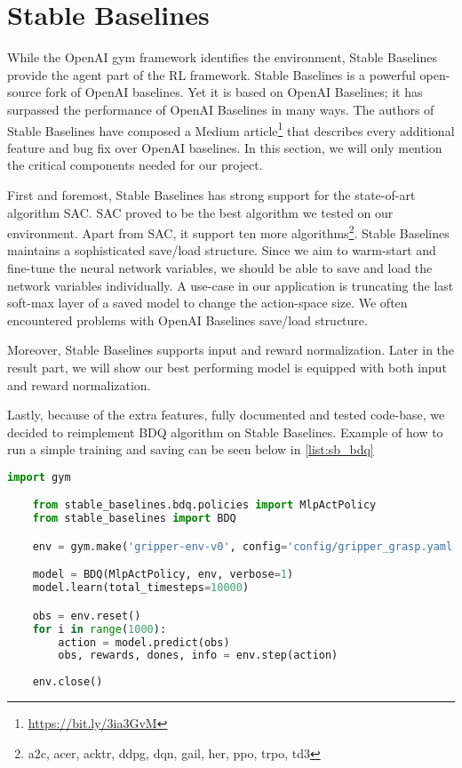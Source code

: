 \section{Stable Baselines}


While the OpenAI gym framework identifies the environment, Stable Baselines provide the agent part of the RL framework. Stable Baselines is a powerful open-source fork of OpenAI baselines. Yet it is based on OpenAI Baselines; it has surpassed the performance of OpenAI Baselines in many ways. 
The authors of Stable Baselines have composed a Medium article\footnote{\url{https://bit.ly/3ia3GvM}} that describes every additional feature and bug fix over OpenAI baselines. In this section, we will only mention the critical components needed for our project.

First and foremost, Stable Baselines has strong support for the state-of-art algorithm SAC. SAC proved to be the best algorithm we tested on our environment. Apart from SAC, it support ten more algorithms\footnote{a2c, 
acer, acktr, ddpg, dqn, gail, her, ppo, trpo, td3}. Stable Baselines maintains a sophisticated save/load structure. Since we aim to warm-start and fine-tune the neural network variables, we should be able to save and load the network variables individually. A use-case in our application is truncating the last soft-max layer of a saved model to change the action-space size. We often encountered problems with OpenAI Baselines save/load structure.

Moreover, Stable Baselines supports input and reward normalization. Later in the result part, we will show our best performing model is equipped with both input and reward normalization.

Lastly, because of the extra features, fully documented and tested code-base, we decided to reimplement BDQ algorithm on Stable Baselines. Example of how to run a simple training and saving can be seen below in \ref{list:sb_bdq}


\begin{lstlisting}[language=Python, caption=Example of training and saving BDQ algorithm on gripper-env, label=list:sb_bdq]
    import gym

    from stable_baselines.bdq.policies import MlpActPolicy
    from stable_baselines import BDQ

    env = gym.make('gripper-env-v0', config='config/gripper_grasp.yaml')

    model = BDQ(MlpActPolicy, env, verbose=1)
    model.learn(total_timesteps=10000)

    obs = env.reset()
    for i in range(1000):
        action = model.predict(obs)
        obs, rewards, dones, info = env.step(action)
    
    env.close()
\end{lstlisting}